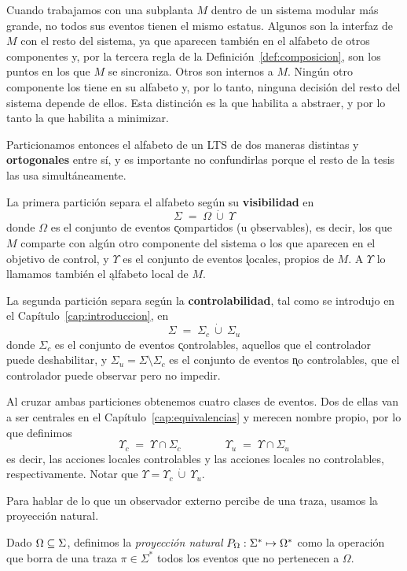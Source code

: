 Cuando trabajamos con una subplanta $M$ dentro de un sistema modular más grande, no todos sus
eventos tienen el mismo estatus. Algunos son la interfaz de $M$ con el resto del sistema, ya que
aparecen también en el alfabeto de otros componentes y, por la tercera regla de la
Definición~\ref{def:composicion}, son los puntos en los que $M$ se sincroniza. Otros son
internos a $M$. Ningún otro componente los tiene en su alfabeto y, por lo tanto, ninguna
decisión del resto del sistema depende de ellos. Esta distinción es la que habilita a abstraer,
y por lo tanto la que habilita a minimizar.

Particionamos entonces el alfabeto de un LTS de dos maneras distintas y \textbf{ortogonales}
entre sí, y es importante no confundirlas porque el resto de la tesis las usa simultáneamente.

La primera partición separa el alfabeto según su \textbf{visibilidad} en
\[
\Sigma \;=\; \Omega \ \dot{\cup} \ \Upsilon
\]
donde $\Omega$ es el conjunto de eventos \k{compartidos} (u \k{observables}), es decir, los
que $M$ comparte con algún otro componente del sistema o los que aparecen en el objetivo de
control, y $\Upsilon$ es el conjunto de eventos \k{locales}, propios de $M$. A $\Upsilon$ lo llamamos
también el \k{alfabeto local} de $M$.

La segunda partición separa según la \textbf{controlabilidad}, tal como se introdujo en el
Capítulo~\ref{cap:introduccion}, en
\[
\Sigma \;=\; \Sigma_c \ \dot{\cup} \ \Sigma_u
\]
donde $\Sigma_c$ es el conjunto de eventos \k{controlables}, aquellos que el controlador puede
deshabilitar, y $\Sigma_u = \Sigma \setminus \Sigma_c$ es el conjunto de eventos
\k{no controlables}, que el controlador puede observar pero no impedir.

Al cruzar ambas particiones obtenemos cuatro clases de eventos. Dos de ellas van a ser centrales
en el Capítulo~\ref{cap:equivalencias} y merecen nombre propio, por lo que definimos
\[
\Upsilon_c \;=\; \Upsilon \cap \Sigma_c
\qquad\qquad
\Upsilon_u \;=\; \Upsilon \cap \Sigma_u
\]
es decir, las acciones locales controlables y las acciones locales no controlables,
respectivamente. Notar que $\Upsilon = \Upsilon_c \ \dot{\cup} \ \Upsilon_u$. 

Para hablar de lo que un observador externo percibe de una traza, usamos la proyección natural.

\begin{definition}
\label{def:proyeccion}
Dado $\Omega \subseteq \Sigma$, definimos la \textit{proyección natural}
$P_{\Omega} : \Sigma^{*} \mapsto \Omega^{*}$ como la operación que borra de una traza
$\pi \in \Sigma^{*}$ todos los eventos que no pertenecen a $\Omega$.
\end{definition}

